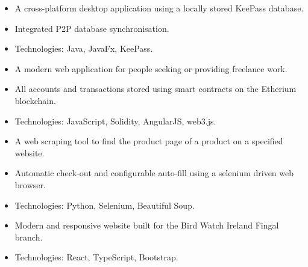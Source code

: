 \documentclass[9pt,a4paper,ragged2e, normalphoto]{altacv-dean}
\begin{document}
    
    \divider
    


    \begin{itemize}
        \item A cross-platform desktop application using a locally stored KeePass database.
        \item Integrated P2P database synchronisation.
        \item Technologies: Java, JavaFx, KeePass.
    \end{itemize}
    \divider

    \begin{itemize}
        \item  A modern web application for people seeking or providing freelance work.
        \item All accounts and transactions stored using smart contracts on the Etherium blockchain.
        \item Technologies: JavaScript, Solidity, AngularJS, web3.js.
    \end{itemize}
    
    \begin{fullwidth}
    \divider
    
    \begin{itemize}
        \item A web scraping tool to find the product page of a product on a specified website.
        \item Automatic check-out and configurable auto-fill using a selenium driven web browser.
        \item Technologies: Python, Selenium, Beautiful Soup.
    \end{itemize}
    \divider
    
    \begin{itemize}
        \item Modern and responsive website built for the Bird Watch Ireland Fingal branch.
        \item Technologies: React, TypeScript, Bootstrap.
    \end{itemize}

\end{fullwidth}
\end{document}
